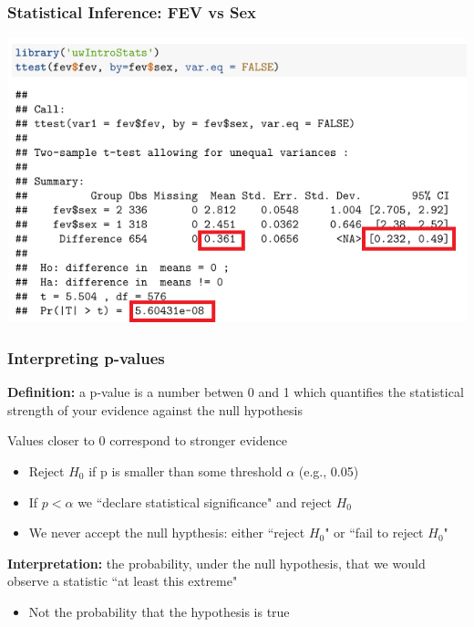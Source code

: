 \documentclass[12pt, 
hyperref={colorlinks=true, linkcolor=blue, urlcolor=cyan}]{beamer}
\begin{document}
\begin{frame}
\frametitle{Statistical Inference: FEV vs Sex}

\includegraphics[width=\textwidth]{./t-test-highlights}

\end{frame}

\begin{frame}
\frametitle{Interpreting p-values}

\textbf{Definition:} a p-value is a number betwen 0 and 1 which quantifies the statistical strength of your evidence against the null hypothesis

Values closer to 0 correspond to stronger evidence\vspace{-0.3cm}
	\begin{itemize}
	\item Reject $H_0$ if p is smaller than some threshold $\alpha$ (e.g., 0.05)
	\item If $p < \alpha$ we ``declare statistical significance" and reject $H_0$
	\item \color{red} We never accept the null hypthesis: \color{black} either ``reject $H_0$" or ``fail to reject $H_0$"
	\end{itemize}
\textbf{Interpretation:} the probability, under the null hypothesis, that we would observe a statistic ``at least this extreme"\vspace{-0.3cm}
	\begin{itemize}
	\item \color{red} Not \color{black} the probability that the hypothesis is true
	\end{itemize}

\end{frame}
\end{document}
